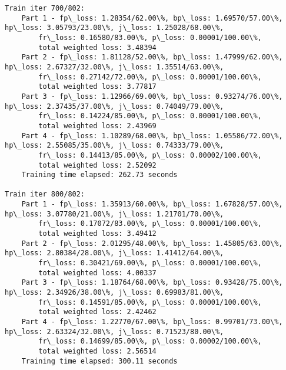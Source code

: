 \documentclass[11pt]{article}
\begin{document}
\begin{Verbatim}[commandchars=\\\{\}]
Train iter 700/802:
	Part 1 - fp\_loss: 1.28354/62.00\%, bp\_loss: 1.69570/57.00\%, hp\_loss: 3.05793/23.00\%, j\_loss: 1.25028/68.00\%, 
		fr\_loss: 0.16580/83.00\%, p\_loss: 0.00001/100.00\%, 
		total weighted loss: 3.48394
	Part 2 - fp\_loss: 1.81128/52.00\%, bp\_loss: 1.47999/62.00\%, hp\_loss: 2.67327/32.00\%, j\_loss: 1.35514/63.00\%, 
		fr\_loss: 0.27142/72.00\%, p\_loss: 0.00001/100.00\%, 
		total weighted loss: 3.77817
	Part 3 - fp\_loss: 1.12966/69.00\%, bp\_loss: 0.93274/76.00\%, hp\_loss: 2.37435/37.00\%, j\_loss: 0.74049/79.00\%, 
		fr\_loss: 0.14224/85.00\%, p\_loss: 0.00001/100.00\%, 
		total weighted loss: 2.43969
	Part 4 - fp\_loss: 1.10289/68.00\%, bp\_loss: 1.05586/72.00\%, hp\_loss: 2.55085/35.00\%, j\_loss: 0.74333/79.00\%, 
		fr\_loss: 0.14413/85.00\%, p\_loss: 0.00002/100.00\%, 
		total weighted loss: 2.52092
	Training time elapsed: 262.73 seconds

Train iter 800/802:
	Part 1 - fp\_loss: 1.35913/60.00\%, bp\_loss: 1.67828/57.00\%, hp\_loss: 3.07780/21.00\%, j\_loss: 1.21701/70.00\%, 
		fr\_loss: 0.17072/83.00\%, p\_loss: 0.00001/100.00\%, 
		total weighted loss: 3.49412
	Part 2 - fp\_loss: 2.01295/48.00\%, bp\_loss: 1.45805/63.00\%, hp\_loss: 2.80384/28.00\%, j\_loss: 1.41412/64.00\%, 
		fr\_loss: 0.30421/69.00\%, p\_loss: 0.00001/100.00\%, 
		total weighted loss: 4.00337
	Part 3 - fp\_loss: 1.18764/68.00\%, bp\_loss: 0.93428/75.00\%, hp\_loss: 2.34926/38.00\%, j\_loss: 0.69983/81.00\%, 
		fr\_loss: 0.14591/85.00\%, p\_loss: 0.00001/100.00\%, 
		total weighted loss: 2.42462
	Part 4 - fp\_loss: 1.22770/67.00\%, bp\_loss: 0.99701/73.00\%, hp\_loss: 2.63324/32.00\%, j\_loss: 0.71523/80.00\%, 
		fr\_loss: 0.14699/85.00\%, p\_loss: 0.00002/100.00\%, 
		total weighted loss: 2.56514
	Training time elapsed: 300.11 seconds


\end{Verbatim}
\end{document}
